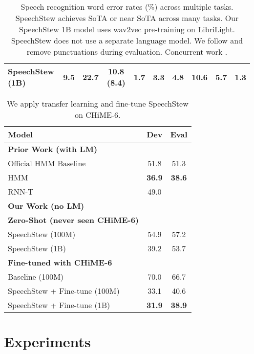 \documentclass[a4paper]{article}
\begin{document}
\begin{table*}[t]
{\begin{tabular}{lccccccccc}
\quad SpeechStew (1B) & 9.5 & 22.7 & \textbf{10.8 (8.4)} & \textbf{1.7} & \textbf{3.3} & 4.8 & 10.6 & 5.7 & \textbf{1.3} \\
\bottomrule
\end{tabular}}
\caption{Speech recognition word error rates (\%) across multiple tasks. SpeechStew achieves SoTA or near SoTA across many tasks. Our SpeechStew 1B model uses wav2vec pre-training on LibriLight. SpeechStew does not use a separate language model. We follow \cite{likhomanenko-arxiv-2020} and remove punctuations during evaluation. Concurrent work \cite{kanda-arxiv-2021}.}
\label{table:results}
\end{table*}

\begin{table}[t]
\centering
\begin{tabular}{lcc}
\toprule
\bfseries Model & \bfseries Dev & \bfseries Eval \\
\midrule
\textbf{Prior Work (with LM)} \\
\quad Official HMM Baseline \cite{watanabe-arxiv-2020} & 51.8 & 51.3 \\
\quad HMM \cite{medennikov-chime-2020} & \textbf{36.9} & \textbf{38.6} \\
\quad RNN-T \cite{andrusenko-arxiv-2020} & 49.0 \\
\midrule
\textbf{Our Work (no LM)} \\
\quad\textbf{Zero-Shot (never seen CHiME-6)} \\
\quad\quad SpeechStew (100M) & 54.9 & 57.2 \\
\quad\quad SpeechStew (1B) & 39.2 & 53.7 \\
\quad\textbf{Fine-tuned with CHiME-6} \\
\quad\quad Baseline (100M) & 70.0 & 66.7 \\
\quad\quad SpeechStew + Fine-tune (100M) & 33.1 & 40.6 \\
\quad\quad SpeechStew + Fine-tune (1B) & \textbf{31.9} & \textbf{38.9} \\
\bottomrule
\end{tabular}
\caption{We apply transfer learning and fine-tune SpeechStew on CHiME-6.}
\label{tab:chime}
\end{table}

\section{Experiments}
\end{document}
